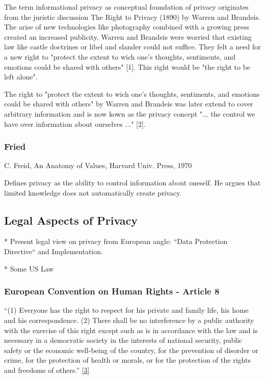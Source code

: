 The term informational privacy as conceptual foundation of privacy originates from the juristic discussion The Right to Privacy (1890) by Warren and Brandeis.
The arise of new technologies like photography combined with a growing press created an increased publicity.
Warren and Brandeis were worried that existing law like castle doctrines or libel and slander could not suffice.
They felt a need for a new right to "protect the extent to wich one's thoughts, sentiments, and emotions could be shared with others" [1].
This right would be "the right to be left alone".

The right to "protect the extent to wich one's thoughts, sentiments, and emotions could be shared with others" by Warren and Brandeis was later extend to cover arbitrary information and is now kown as the privacy concept "... the control we have over information about ourselves ..." [2].

\subsubsection{Fried}

C. Freid, An Anatomy of Values, Harvard Univ. Press, 1970

Defines privacy as the ability to control information about oneself. He argues that limited knowledge does not automatically create privacy.

\subsection{Legal Aspects of Privacy}

* Present legal view on privacy from European angle: ``Data Protection Directive`` and Implementation.

* Some US Law

\subsubsection{European Convention on Human Rights - Article 8}

``(1) Everyone has the right to respect for his private and family life, his home and his correspondence. (2) There shall be no interference by a public authority with the exercise of this right except such as is in accordance with the law and is necessary in a democratic society in the interests of national security, public safety or the economic well-being of the country, for the prevention of disorder or crime, for the protection of health or morals, or for the protection of the rights and freedoms of others.'' {[}\hyperref[references]{3}{]}

